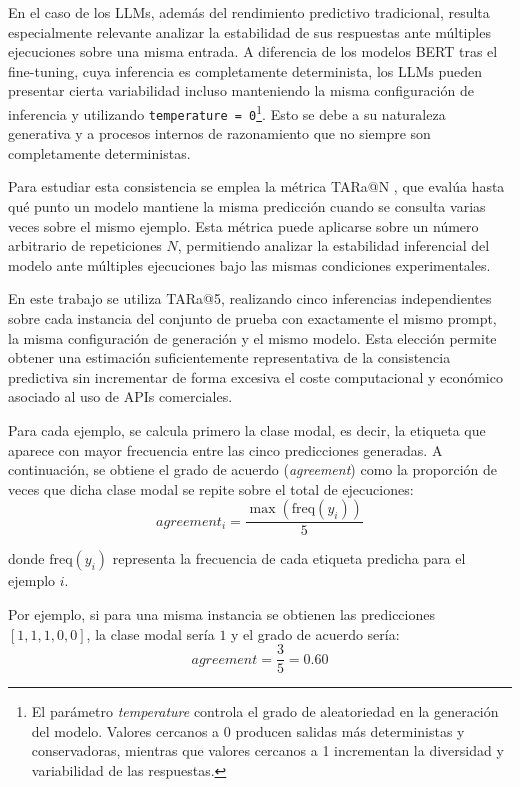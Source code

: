 En el caso de los \acp{LLM}, además del rendimiento predictivo tradicional, resulta especialmente relevante analizar la estabilidad de sus respuestas ante múltiples ejecuciones sobre una misma entrada. A diferencia de los modelos \ac{BERT} tras el fine-tuning, cuya inferencia es completamente determinista, los \acp{LLM} pueden presentar cierta variabilidad incluso manteniendo la misma configuración de inferencia y utilizando \texttt{temperature = 0}\footnote{El parámetro \textit{temperature} controla el grado de aleatoriedad en la generación del modelo. Valores cercanos a 0 producen salidas más deterministas y conservadoras, mientras que valores cercanos a 1 incrementan la diversidad y variabilidad de las respuestas.}. Esto se debe a su naturaleza generativa y a procesos internos de razonamiento que no siempre son completamente deterministas.

Para estudiar esta consistencia se emplea la métrica \ac{TARa@N} \cite{atil_non-determinism_2025}, que evalúa hasta qué punto un modelo mantiene la misma predicción cuando se consulta varias veces sobre el mismo ejemplo. Esta métrica puede aplicarse sobre un número arbitrario de repeticiones \(N\), permitiendo analizar la estabilidad inferencial del modelo ante múltiples ejecuciones bajo las mismas condiciones experimentales.

En este trabajo se utiliza \ac{TARa@5}, realizando cinco inferencias independientes sobre cada instancia del conjunto de prueba con exactamente el mismo prompt, la misma configuración de generación y el mismo modelo. Esta elección permite obtener una estimación suficientemente representativa de la consistencia predictiva sin incrementar de forma excesiva el coste computacional y económico asociado al uso de APIs comerciales.

Para cada ejemplo, se calcula primero la clase modal, es decir, la etiqueta que aparece con mayor frecuencia entre las cinco predicciones generadas. A continuación, se obtiene el grado de acuerdo (\textit{agreement}) como la proporción de veces que dicha clase modal se repite sobre el total de ejecuciones:
\[
agreement_i =
\frac{\max\left(\text{freq}(y_i)\right)}{5}
\]

donde \(\text{freq}(y_i)\) representa la frecuencia de cada etiqueta predicha para el ejemplo \(i\).

Por ejemplo, si para una misma instancia se obtienen las predicciones \([1,1,1,0,0]\), la clase modal sería \(1\) y el grado de acuerdo sería:
\[
agreement =
\frac{3}{5} = 0.60
\]

